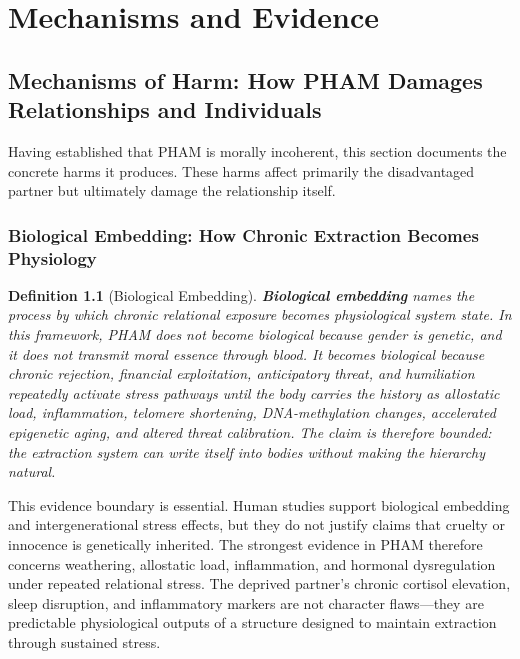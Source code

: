 \documentclass[12pt,openany]{book}
\newtheorem{definition}{Definition}[chapter]
\numberwithin{equation}{chapter}
\begin{document}
\part{Mechanisms and Evidence}

\chapter{Mechanisms of Harm: How PHAM Damages Relationships and Individuals}

Having established that PHAM is morally incoherent, this section documents the concrete harms it produces. These harms affect primarily the disadvantaged partner but ultimately damage the relationship itself.

\section{Biological Embedding: How Chronic Extraction Becomes Physiology}

\begin{definition}[Biological Embedding]
\label{def:biological_embedding}
\textbf{Biological embedding} names the process by which chronic relational exposure
becomes physiological system state. In this framework, PHAM does not become
biological because gender is genetic, and it does not transmit moral essence
through blood. It becomes biological because chronic rejection, financial exploitation,
anticipatory threat, and humiliation repeatedly activate stress
pathways until the body carries the history as allostatic load, inflammation,
telomere shortening, DNA-methylation changes, accelerated epigenetic aging, and
altered threat calibration. The claim is therefore bounded: the extraction
system can write itself into bodies without making the hierarchy natural.
\end{definition}

This evidence boundary is essential. Human studies support biological embedding
and intergenerational stress effects, but they do not justify claims that cruelty
or innocence is genetically inherited. The strongest evidence in PHAM therefore
concerns weathering, allostatic load, inflammation, and hormonal dysregulation under
repeated relational stress. The deprived partner's chronic cortisol elevation,
sleep disruption, and inflammatory markers are not character flaws---they are
predictable physiological outputs of a structure designed to maintain extraction
through sustained stress.
\end{document}
